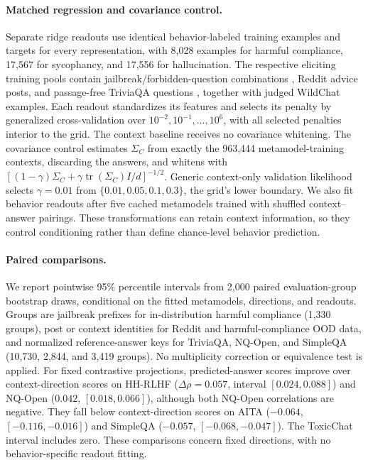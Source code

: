 \paragraph{Matched regression and covariance control.} Separate ridge readouts use identical behavior-labeled training examples and targets for every representation, with 8,028 examples for harmful compliance, 17,567 for sycophancy, and 17,556 for hallucination. The respective eliciting training pools contain jailbreak/forbidden-question combinations \citep{shen2024jailbreak}, Reddit advice posts, and passage-free TriviaQA questions \citep{joshi2017triviaqa}, together with judged WildChat examples. Each readout standardizes its features and selects its penalty by generalized cross-validation over $10^{-2},10^{-1},\ldots,10^6$, with all selected penalties interior to the grid. The context baseline receives no covariance whitening. The covariance control estimates $\Sigma_C$ from exactly the 963,444 metamodel-training contexts, discarding the answers, and whitens with $[(1-\gamma)\Sigma_C+\gamma\operatorname{tr}(\Sigma_C)I/d]^{-1/2}$. Generic context-only validation likelihood selects $\gamma=0.01$ from $\{0.01,0.05,0.1,0.3\}$, the grid's lower boundary. We also fit behavior readouts after five cached metamodels trained with shuffled context--answer pairings. These transformations can retain context information, so they control conditioning rather than define chance-level behavior prediction.

\paragraph{Paired comparisons.} We report pointwise 95\% percentile intervals from 2,000 paired evaluation-group bootstrap draws, conditional on the fitted metamodels, directions, and readouts. Groups are jailbreak prefixes for in-distribution harmful compliance (1,330 groups), post or context identities for Reddit and harmful-compliance OOD data, and normalized reference-answer keys for TriviaQA, NQ-Open, and SimpleQA (10,730, 2,844, and 3,419 groups). No multiplicity correction or equivalence test is applied. For fixed contrastive projections, predicted-answer scores improve over context-direction scores on HH-RLHF ($\Delta\rho=0.057$, interval $[0.024,0.088]$) and NQ-Open ($0.042$, $[0.018,0.066]$), although both NQ-Open correlations are negative. They fall below context-direction scores on AITA ($-0.064$, $[-0.116,-0.016]$) and SimpleQA ($-0.057$, $[-0.068,-0.047]$). The ToxicChat interval includes zero. These comparisons concern fixed directions, with no behavior-specific readout fitting.

